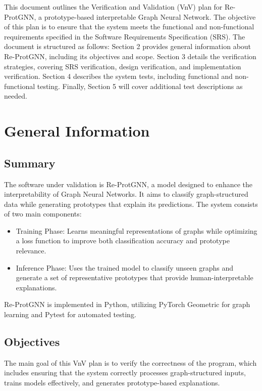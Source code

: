 \documentclass[12pt, titlepage]{article}
\begin{document}
\newpage


This document outlines the Verification and Validation (VnV) plan for Re-ProtGNN, a prototype-based interpretable Graph Neural Network. The objective of this plan is to ensure that the system meets the functional and non-functional requirements specified in the Software Requirements Specification (SRS). The document is structured as follows: Section 2 provides general information about Re-ProtGNN, including its objectives and scope. Section 3 details the verification strategies, covering SRS verification, design verification, and implementation verification. Section 4 describes the system tests, including functional and non-functional testing. Finally, Section 5 will cover additional test descriptions as needed.

\section{General Information}

\subsection{Summary}

The software under validation is Re-ProtGNN, a model designed to enhance the interpretability of Graph Neural Networks. It aims to classify graph-structured data while generating prototypes that explain its predictions. The system consists of two main components:

\begin{itemize}
    \item Training Phase: Learns meaningful representations of graphs while optimizing a loss function to improve both classification accuracy and prototype relevance.
    \item Inference Phase: Uses the trained model to classify unseen graphs and generate a set of representative prototypes that provide human-interpretable explanations.
\end{itemize}

Re-ProtGNN is implemented in Python, utilizing PyTorch Geometric for graph learning and Pytest for automated testing.


\subsection{Objectives}

The main goal of this VnV plan is to verify the correctness of the program, which includes ensuring that the system correctly processes graph-structured inputs, trains models effectively, and generates prototype-based explanations.
\end{document}
